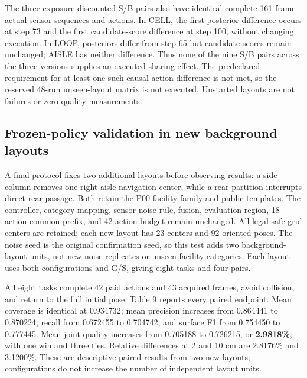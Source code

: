 \documentclass[11pt,a4paper]{article}
\begin{document}
The three exposure-discounted S/B pairs also have identical complete 161-frame actual sensor sequences and actions. In CELL, the first posterior difference occurs at step 73 and the first candidate-score difference at step 100, without changing execution. In LOOP, posteriors differ from step 65 but candidate scores remain unchanged; AISLE has neither difference. Thus none of the nine S/B pairs across the three versions supplies an executed sharing effect. The predeclared requirement for at least one such causal action difference is not met, so the reserved 48-run unseen-layout matrix is not executed. Unstarted layouts are not failures or zero-quality measurements.

\hypertarget{frozen-policy-validation-in-new-background-layouts}{%
\subsection{Frozen-policy validation in new background layouts}\label{frozen-policy-validation-in-new-background-layouts}}

A final protocol fixes two additional layouts before observing results: a side column removes one right-aisle navigation center, while a rear partition interrupts direct rear passage. Both retain the P00 facility family and public templates. The controller, category mapping, sensor noise rule, fusion, evaluation region, 18-action common prefix, and 42-action budget remain unchanged. All legal safe-grid centers are retained; each new layout has 23 centers and 92 oriented poses. The noise seed is the original confirmation seed, so this test adds two background-layout units, not new noise replicates or unseen facility categories. Each layout uses both configurations and G/S, giving eight tasks and four pairs.

All eight tasks complete 42 paid actions and 43 acquired frames, avoid collision, and return to the full initial pose. Table 9 reports every paired endpoint. Mean coverage is identical at 0.934732; mean precision increases from 0.864441 to 0.870224, recall from 0.672455 to 0.704742, and surface F1 from 0.754450 to 0.777445. Mean joint quality increases from 0.705188 to 0.726215, or \textbf{2.9818\%}, with one win and three ties. Relative differences at 2 and 10 cm are 2.8176\% and 3.1200\%. These are descriptive paired results from two new layouts; configurations do not increase the number of independent layout units.
\end{document}
